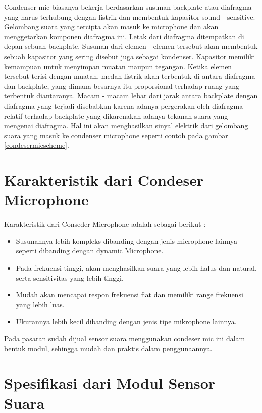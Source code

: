 Condenser mic biasanya bekerja berdasarkan susunan backplate atau diafragma yang harus terhubung dengan listrik dan membentuk kapasitor sound - sensitive. Gelombang suara yang tercipta akan masuk ke microphone dan akan menggetarkan komponen diafragma ini. Letak dari diafragma ditempatkan di depan sebuah backplate. Susunan dari elemen - elemen tersebut akan membentuk sebuah kapasitor yang sering disebut juga sebagai kondenser. Kapasitor memiliki kemampuan untuk menyimpan muatan maupun tegangan. Ketika elemen tersebut terisi dengan muatan, medan listrik akan terbentuk di antara diafragma dan backplate, yang dimana besarnya itu proporsional terhadap ruang yang terbentuk diantaranya. Macam - macam lebar dari jarak antara backplate dengan diafragma yang terjadi disebabkan karena adanya pergerakan oleh diafragma relatif terhadap backplate yang dikarenakan adanya tekanan suara yang mengenai diafragma. Hal ini akan menghasilkan sinyal elektrik dari gelombang suara yang masuk ke condenser microphone seperti contoh pada gambar \ref{condesermicscheme}.

\section{Karakteristik dari Condeser Microphone}

\hspace{4mm} Karakteristik dari Conseder Microphone adalah sebagai berikut :

\begin{itemize}
\item Susunannya lebih kompleks dibanding dengan jenis microphone lainnya seperti dibanding dengan dynamic Microphone.
\item Pada frekuensi tinggi, akan menghasilkan suara yang lebih halus dan natural, serta sensitivitas yang lebih tinggi.
\item Mudah akan mencapai respon frekuensi flat dan memiliki range frekuensi yang lebih luas.
\item Ukurannya lebih kecil dibanding dengan jenis tipe mikrophone lainnya.
\end{itemize}

Pada pasaran sudah dijual sensor suara menggunakan condeser mic ini dalam bentuk modul, sehingga mudah dan praktis dalam penggunaannya.

\section{Spesifikasi dari Modul Sensor Suara}

